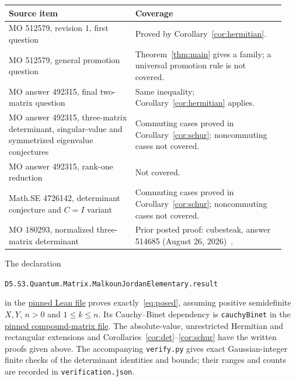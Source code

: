 \documentclass[11pt]{article}
\newcommand{\Id}{I}
\begin{document}
\begin{center}\small
\begin{tabular}{@{}p{0.43\linewidth}p{0.51\linewidth}@{}}
\toprule
Source item & Coverage \\
\midrule
MO 512579, revision 1, first question & Proved by Corollary~\ref{cor:hermitian}. \\
MO 512579, general promotion question & Theorem~\ref{thm:main} gives a family;
a universal promotion rule is not covered. \\
MO answer 492315, final two-matrix question & Same inequality;
Corollary~\ref{cor:hermitian} applies. \\
MO answer 492315, three-matrix determinant, singular-value and
symmetrized eigenvalue conjectures & Commuting cases proved in
Corollary~\ref{cor:schur}; noncommuting cases not covered. \\
MO answer 492315, rank-one reduction & Not covered. \\
Math.SE 4726142, determinant conjecture and $C=\Id$ variant~\cite{river} &
Commuting cases proved in Corollary~\ref{cor:schur}; noncommuting cases not covered. \\
MO 180293, normalized three-matrix determinant & Prior posted proof:
cubesteak, answer 514685 (August 26, 2026)~\cite{cubesteak}. \\
\bottomrule
\end{tabular}
\end{center}

\noindent\begin{minipage}{\linewidth}
The declaration
\begin{center}\small
\texttt{D5.S3.Quantum.Matrix.MalkounJordanElementary.result}
\end{center}
in the
\href{https://github.com/the-omega-institute/trureturing/blob/57b811cedb64c8065c6afac0da57d0fe2c8aa5ab/D5/S3/Quantum/Matrix/MalkounJordanElementary.lean}{pinned Lean file}
proves exactly~\eqref{eq:posed}, assuming positive semidefinite $X,Y$,
$n>0$ and $1\leq k\leq n$.
Its Cauchy--Binet dependency is \texttt{cauchyBinet} in the
\href{https://github.com/the-omega-institute/trureturing/blob/57b811cedb64c8065c6afac0da57d0fe2c8aa5ab/D5/S3/Quantum/Schatten/CompoundMatrices.lean}{pinned compound-matrix file}.
The absolute-value, unrestricted Hermitian and rectangular extensions and
Corollaries~\ref{cor:det}--\ref{cor:schur} have the written proofs given above.
The accompanying \texttt{verify.py} gives exact Gaussian-integer finite checks
of the determinant identities and bounds; their ranges and counts are recorded
in \texttt{verification.json}.
\end{minipage}
\end{document}
